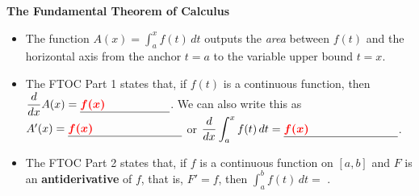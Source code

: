 \documentclass{article}
\begin{document}
\begin{framed}
  \vspace{0.05in}
   \textbf{The Fundamental Theorem of Calculus}
  \begin{itemize}
  \item The function $A(x) = \displaystyle \int_a^x
  f(t)\,dt$ outputs the \textit{area} 
  between $f(t)$ and the horizontal axis from the \newline
      \vfill
      anchor $t=a$ to the variable upper bound $t=x$.
      \item The FTOC Part 1 states that, if $f(t)$ is a continuous function, then $\dfrac{d}{dx}A(x) = \fitb{1.1in}{\textcolor{red}{f(x)}}$.\newline
      \vfill
      We can also write this as $A'(x)=\fitb{1.4in}{\textcolor{red}{f(x)}}$ or $\dfrac{d}{dx}\displaystyle \int_a^x
  f(t)\,dt = \fitb{1.4in}{\textcolor{red}{f(x)}}$.
      \newline
      \vfill
      \item The FTOC Part 2 states that, if $f$ is
  a continuous function on $[a, b]$ and $F$ is an \textbf{antiderivative} of \newline \vfill  $f$,
  that is, $F'=f$, then $\displaystyle \int_a^b f(t)\,dt
  = {}$ \fitb{3.6in}{$\bm{\textcolor{red}{F(b)-F(a)}}$}. 
  \vfill
  \end{itemize}
  \end{framed}
\end{document}
